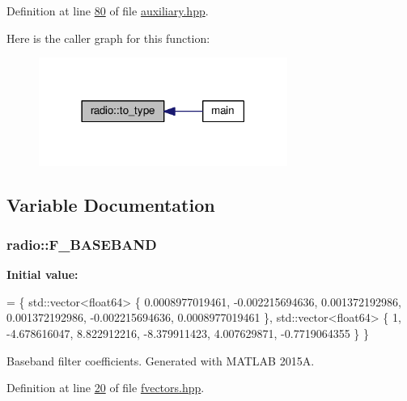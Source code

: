 Definition at line \hyperlink{auxiliary_8hpp_source_l00080}{80} of file \hyperlink{auxiliary_8hpp_source}{auxiliary.\+hpp}.



Here is the caller graph for this function\+:
\nopagebreak
\begin{figure}[H]
\begin{center}
\leavevmode
\includegraphics[width=230pt]{namespaceradio_a402fe28e2e2bb2be7a0d2d9f74cc640d_icgraph}
\end{center}
\end{figure}




\subsection{Variable Documentation}
\hypertarget{namespaceradio_a9bd902e9216499953a5906de73dc1796}{
\subsubsection[{F\+\_\+\+B\+A\+S\+E\+B\+A\+N\+D}]{ radio\+::\+F\+\_\+\+B\+A\+S\+E\+B\+A\+N\+D}}\label{namespaceradio_a9bd902e9216499953a5906de73dc1796}
{\bfseries Initial value\+:}
\begin{DoxyCode}
= \{ std::vector<float64> \{
        0.0008977019461,
            -0.002215694636,
            0.001372192986,
            0.001372192986,
            -0.002215694636,
            0.0008977019461 
    \}, std::vector<float64> \{
        1,
            -4.678616047,
            8.822912216,
            -8.379911423,
            4.007629871,
            -0.7719064355
    \} \}
\end{DoxyCode}
Baseband filter coefficients. Generated with M\+A\+T\+L\+A\+B 2015\+A. 

Definition at line \hyperlink{fvectors_8hpp_source_l00020}{20} of file \hyperlink{fvectors_8hpp_source}{fvectors.\+hpp}.


